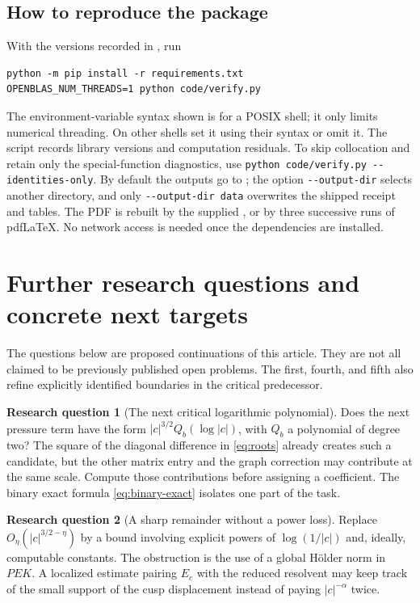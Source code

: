 \documentclass[11pt,a4paper]{article}
\numberwithin{equation}{section}
\theoremstyle{definition}
\newtheorem{question}{Research question}
\theoremstyle{remark}
\newcommand{\code}[1]{\texttt{\detokenize{#1}}}
\begin{document}
\subsection{How to reproduce the package}
With the versions recorded in \code{requirements.txt}, run
\begin{verbatim}
python -m pip install -r requirements.txt
OPENBLAS_NUM_THREADS=1 python code/verify.py
\end{verbatim}
The environment-variable syntax shown is for a POSIX shell; it only
limits numerical threading. On other shells set it using their syntax
or omit it. The script records library versions and computation residuals.
To skip collocation and retain only the special-function diagnostics,
use \texttt{python code/verify.py -{}-identities-only}. By default the
outputs go to \code{recomputed/}; the option \texttt{-{}-output-dir}
selects another directory, and only \texttt{-{}-output-dir data}
overwrites the shipped receipt and tables. The PDF is rebuilt by the supplied
\code{Makefile}, or by three successive runs of pdfLaTeX. No network
access is needed once the dependencies are installed.

\section{Further research questions and concrete next targets}
\label{sec:questions}
The questions below are proposed continuations of this article. They are
not all claimed to be previously published open problems. The first,
fourth, and fifth also refine explicitly identified boundaries in the
critical predecessor.

\begin{question}[The next critical logarithmic polynomial]
Does the next pressure term have the form
$|c|^{3/2}Q_b(\log|c|)$, with $Q_b$ a polynomial of degree two?
The square of the diagonal difference in \cref{eq:roots} already creates
such a candidate, but the other matrix entry and the graph correction
may contribute at the same scale. Compute those contributions before
assigning a coefficient. The binary exact formula
\cref{eq:binary-exact} isolates one part of the task.
\end{question}

\begin{question}[A sharp remainder without a power loss]
Replace $O_\eta(|c|^{3/2-\eta})$ by a bound involving explicit powers of
$\log(1/|c|)$ and, ideally, computable constants. The obstruction is the
use of a global H\"older norm in $PEK$. A localized estimate pairing
$E_c$ with the reduced resolvent may keep track of the small support of
the cusp displacement instead of paying $|c|^{-\alpha}$ twice.
\end{question}
\end{document}
